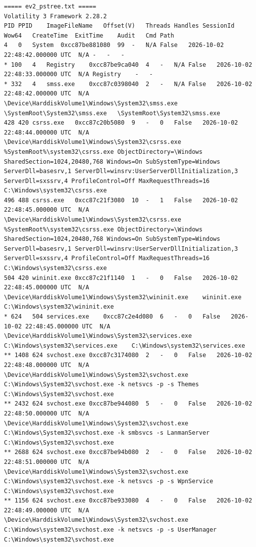 \documentclass[11pt,letterpaper]{article}
\begin{document}
\begin{lstlisting}
===== ev2_pstree.txt =====
﻿Volatility 3 Framework 2.28.2
PID	PPID	ImageFileName	Offset(V)	Threads	Handles	SessionId	Wow64	CreateTime	ExitTime	Audit	Cmd	Path
4	0	System	0xcc87be881080	99	-	N/A	False	2026-10-02 22:48:42.000000 UTC	N/A	-	-	-
* 100	4	Registry	0xcc87be9ca040	4	-	N/A	False	2026-10-02 22:48:33.000000 UTC	N/A	Registry	-	-
* 332	4	smss.exe	0xcc87c0398040	2	-	N/A	False	2026-10-02 22:48:42.000000 UTC	N/A	\Device\HarddiskVolume1\Windows\System32\smss.exe	\SystemRoot\System32\smss.exe	\SystemRoot\System32\smss.exe
428	420	csrss.exe	0xcc87c20b5080	9	-	0	False	2026-10-02 22:48:44.000000 UTC	N/A	\Device\HarddiskVolume1\Windows\System32\csrss.exe	%SystemRoot%\system32\csrss.exe ObjectDirectory=\Windows SharedSection=1024,20480,768 Windows=On SubSystemType=Windows ServerDll=basesrv,1 ServerDll=winsrv:UserServerDllInitialization,3 ServerDll=sxssrv,4 ProfileControl=Off MaxRequestThreads=16	C:\Windows\system32\csrss.exe
496	488	csrss.exe	0xcc87c21f3080	10	-	1	False	2026-10-02 22:48:45.000000 UTC	N/A	\Device\HarddiskVolume1\Windows\System32\csrss.exe	%SystemRoot%\system32\csrss.exe ObjectDirectory=\Windows SharedSection=1024,20480,768 Windows=On SubSystemType=Windows ServerDll=basesrv,1 ServerDll=winsrv:UserServerDllInitialization,3 ServerDll=sxssrv,4 ProfileControl=Off MaxRequestThreads=16	C:\Windows\system32\csrss.exe
504	420	wininit.exe	0xcc87c21f1140	1	-	0	False	2026-10-02 22:48:45.000000 UTC	N/A	\Device\HarddiskVolume1\Windows\System32\wininit.exe	wininit.exe	C:\Windows\system32\wininit.exe
* 624	504	services.exe	0xcc87c2e4d080	6	-	0	False	2026-10-02 22:48:45.000000 UTC	N/A	\Device\HarddiskVolume1\Windows\System32\services.exe	C:\Windows\system32\services.exe	C:\Windows\system32\services.exe
** 1408	624	svchost.exe	0xcc87c3174080	2	-	0	False	2026-10-02 22:48:48.000000 UTC	N/A	\Device\HarddiskVolume1\Windows\System32\svchost.exe	C:\Windows\System32\svchost.exe -k netsvcs -p -s Themes	C:\Windows\System32\svchost.exe
** 2432	624	svchost.exe	0xcc87be944080	5	-	0	False	2026-10-02 22:48:50.000000 UTC	N/A	\Device\HarddiskVolume1\Windows\System32\svchost.exe	C:\Windows\System32\svchost.exe -k smbsvcs -s LanmanServer	C:\Windows\System32\svchost.exe
** 2688	624	svchost.exe	0xcc87be94b080	2	-	0	False	2026-10-02 22:48:51.000000 UTC	N/A	\Device\HarddiskVolume1\Windows\System32\svchost.exe	C:\Windows\system32\svchost.exe -k netsvcs -p -s WpnService	C:\Windows\system32\svchost.exe
** 1156	624	svchost.exe	0xcc87be933080	4	-	0	False	2026-10-02 22:48:49.000000 UTC	N/A	\Device\HarddiskVolume1\Windows\System32\svchost.exe	C:\Windows\system32\svchost.exe -k netsvcs -p -s UserManager	C:\Windows\system32\svchost.exe

\end{lstlisting}
\end{document}
